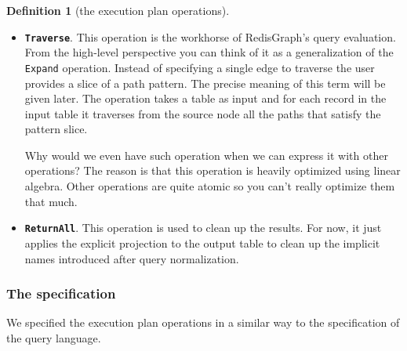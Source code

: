 \documentclass[14pt]{constructor-thesis}
\theoremstyle{definition}
\newtheorem{definition}{Definition}
\begin{document}
\begin{definition}[the execution plan operations]
\begin{itemize}
    \item \textbf{\texttt{Traverse}}. This operation is the workhorse of RedisGraph's query evaluation. From the high-level perspective you can think of it as a generalization of the \texttt{Expand} operation. Instead of specifying a single edge to traverse the user provides a slice of a path pattern. The precise meaning of this term will be given later. The operation takes a table as input and for each record in the input table it traverses from the source node all the paths that satisfy the pattern slice.
    
    Why would we even have such operation when we can express it with other operations? The reason is that this operation is heavily optimized using linear algebra. Other operations are quite atomic so you can't really optimize them that much.

    \item \textbf{\texttt{ReturnAll}}. This operation is used to clean up the results. For now, it just applies the explicit projection to the output table to clean up the implicit names introduced after query normalization.
    
  \end{itemize}
\end{definition}

\subsubsection*{The specification}

We specified the execution plan operations in a similar way to the specification of the query language.
\end{document}
